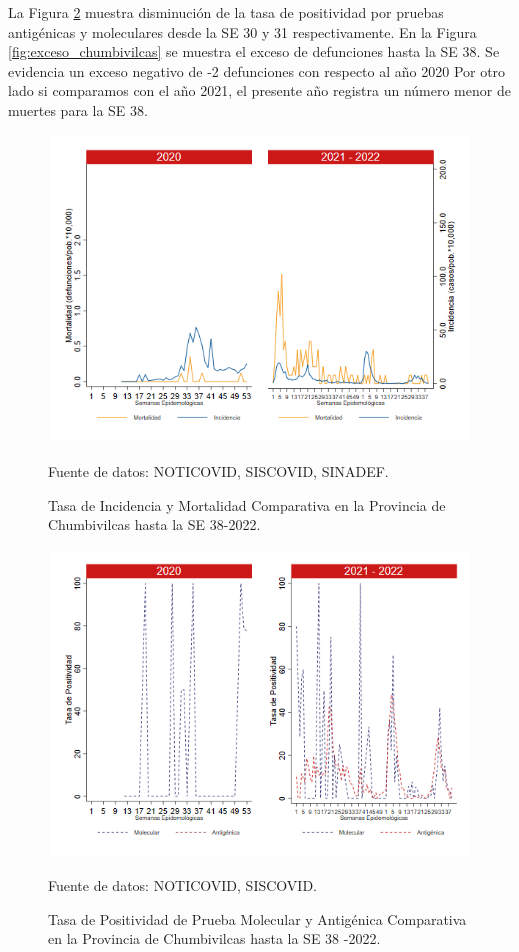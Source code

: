 \documentclass[12pt,a4paper,openany]{book}
\begin{document}
	\noindent La Figura \ref{fig:positividad_chumbivilcas} muestra disminución de la tasa de positividad por pruebas antigénicas y moleculares desde la SE 30 y 31 respectivamente. En la Figura \ref{fig:exceso_chumbivilcas} se muestra el exceso de defunciones hasta la SE 38. Se evidencia un exceso negativo de -2 defunciones con respecto al año 2020 Por otro lado si comparamos con el año 2021, el presente año registra un número menor de muertes para la SE 38.
	
	\begin{figure}[h]
		\caption{Tasa de Incidencia y Mortalidad Comparativa en la Provincia de Chumbivilcas hasta la SE 38-2022.}\label{fig:inc_mort_chumbivilcas}
		\begin{center}
			\includegraphics[width=0.85\linewidth]{../figuras/incidencia_mortalidad_20_21_6.png}
		\end{center}
		{\footnotesize {Fuente de datos: NOTICOVID, SISCOVID, SINADEF.}}
	\end{figure}
	
	\begin{figure}[h]
		\caption{Tasa de Positividad de Prueba Molecular y Antigénica Comparativa en la Provincia de Chumbivilcas hasta la SE 38 -2022.}\label{fig:positividad_chumbivilcas}
		\begin{center}
			\includegraphics[width=0.7\linewidth]{../figuras/positividad_20_21_6.png}
		\end{center}
		{\footnotesize {Fuente de datos: NOTICOVID, SISCOVID.}}
	\end{figure}
	
\end{document}
